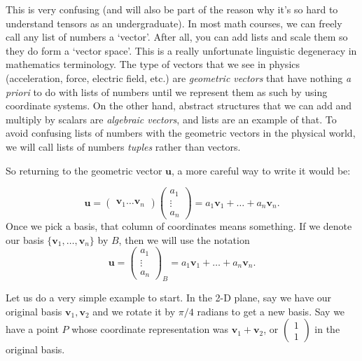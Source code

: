 	This is very confusing (and will also be part of the reason why it's so hard to understand tensors as an undergraduate). In most math courses, we can freely call any list of numbers a `vector'. After all, you can add lists and scale them so they do form a `vector space'. This is a really unfortunate linguistic degeneracy in mathematics terminology. The type of vectors that we see in physics (acceleration, force, electric field, etc.) are \emph{geometric vectors} that have nothing \emph{a priori} to do with lists of numbers until we represent them as such by using coordinate systems. On the other hand, abstract structures that we can add and multiply by scalars are \emph{algebraic vectors}, and lists are an example of that. To avoid confusing lists of numbers with the geometric vectors in the physical world, we will call lists of numbers \emph{tuples} rather than vectors.
	
	So returning to the geometric vector $\mathbf u$, a more careful way to write it would be:
	
	\begin{equation}\label{eq:RepU}
		\mathbf u = \begin{pmatrix}
			\mathbf v_1  \dots \mathbf v_n
		\end{pmatrix}\begin{pmatrix} a_1 \\ \vdots \\a_n	\end{pmatrix} = a_1 \mathbf v_1 + \dots + a_n \mathbf v_n.
	\end{equation}	
	Once we pick a basis, that column of coordinates means something. If we denote our basis $\{\mathbf v_1, \dots, \mathbf v_n \}$ by $B$, then we will use the notation 
	\begin{equation*}
		\mathbf u = \begin{pmatrix} a_1 \\ \vdots \\a_n	\end{pmatrix}_B = a_1 \mathbf v_1 + \dots + a_n \mathbf v_n.
	\end{equation*}
	
	
	Let us do a very simple example to start. In the 2-D plane, say we have our original basis $\mathbf v_1, \mathbf v_2$ and we rotate it by $\pi/4$ radians to get a new basis. Say we have a point $P$ whose coordinate representation was $\mathbf v_1 + \mathbf v_2$, or $\begin{pmatrix} 1 \\ 1 \end{pmatrix}$ in the original basis.
	
